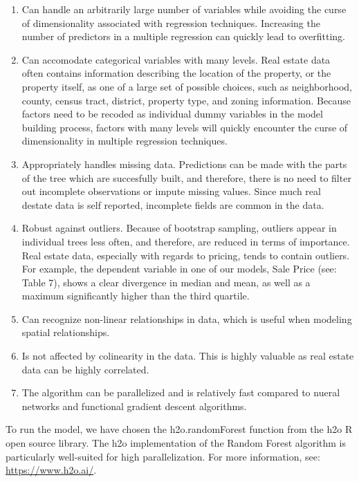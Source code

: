 \documentclass[]{article}
\providecommand{\tightlist}{%
  \setlength{\itemsep}{0pt}\setlength{\parskip}{0pt}}
\begin{document}
\begin{enumerate}
\def\labelenumi{\arabic{enumi}.}
\tightlist
\item
  Can handle an arbitrarily large number of variables while avoiding the
  curse of dimensionality associated with regression techniques.
  Increasing the number of predictors in a multiple regression can
  quickly lead to overfitting.
\item
  Can accomodate categorical variables with many levels. Real estate
  data often contains information describing the location of the
  property, or the property itself, as one of a large set of possible
  choices, such as neighborhood, county, census tract, district,
  property type, and zoning information. Because factors need to be
  recoded as individual dummy variables in the model building process,
  factors with many levels will quickly encounter the curse of
  dimensionality in multiple regression techniques.
\item
  Appropriately handles missing data. Predictions can be made with the
  parts of the tree which are succesfully built, and therefore, there is
  no need to filter out incomplete observations or impute missing
  values. Since much real destate data is self reported, incomplete
  fields are common in the data.
\item
  Robust against outliers. Because of bootstrap sampling, outliers
  appear in individual trees less often, and therefore, are reduced in
  terms of importance. Real estate data, especially with regards to
  pricing, tends to contain outliers. For example, the dependent
  variable in one of our models, Sale Price (see: Table 7), shows a
  clear divergence in median and mean, as well as a maximum
  significantly higher than the third quartile.
\item
  Can recognize non-linear relationships in data, which is useful when
  modeling spatial relationships.
\item
  Is not affected by colinearity in the data. This is highly valuable as
  real estate data can be highly correlated.
\item
  The algorithm can be parallelized and is relatively fast compared to
  nueral networks and functional gradient descent algorithms.
\end{enumerate}

To run the model, we have chosen the h2o.randomForest function from the
h2o R open source library. The h2o implementation of the Random Forest
algorithm is particularly well-suited for high parallelization. For more
information, see: \url{https://www.h2o.ai/}.
\end{document}
